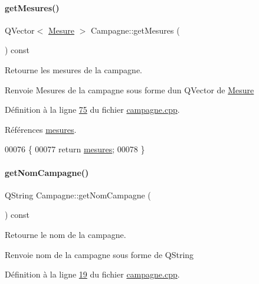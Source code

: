 \paragraph{\texorpdfstring{get\+Mesures()}{getMesures()}}
{\footnotesize\ttfamily Q\+Vector$<$ \hyperlink{struct_mesure}{Mesure} $>$ Campagne\+::get\+Mesures (\begin{DoxyParamCaption}{ }\end{DoxyParamCaption}) const}



Retourne les mesures de la campagne. 

\begin{DoxyReturn}{Renvoie}
Mesures de la campagne sous forme d\textquotesingle{}un Q\+Vector de \hyperlink{struct_mesure}{Mesure} 
\end{DoxyReturn}


Définition à la ligne \hyperlink{campagne_8cpp_source_l00075}{75} du fichier \hyperlink{campagne_8cpp_source}{campagne.\+cpp}.



Références \hyperlink{campagne_8h_source_l00047}{mesures}.


\begin{DoxyCode}
00076 \{
00077     \textcolor{keywordflow}{return} \hyperlink{class_campagne_ac460df42e2fbc12aae7b97abbe219ad0}{mesures};
00078 \}
\end{DoxyCode}
\mbox{\label{class_campagne_a99a682fcb8e5a3f8c2aff7a44eb2c930}} 
\paragraph{\texorpdfstring{get\+Nom\+Campagne()}{getNomCampagne()}}
{\footnotesize\ttfamily Q\+String Campagne\+::get\+Nom\+Campagne (\begin{DoxyParamCaption}{ }\end{DoxyParamCaption}) const}



Retourne le nom de la campagne. 

\begin{DoxyReturn}{Renvoie}
nom de la campagne sous forme de Q\+String 
\end{DoxyReturn}


Définition à la ligne \hyperlink{campagne_8cpp_source_l00019}{19} du fichier \hyperlink{campagne_8cpp_source}{campagne.\+cpp}.



